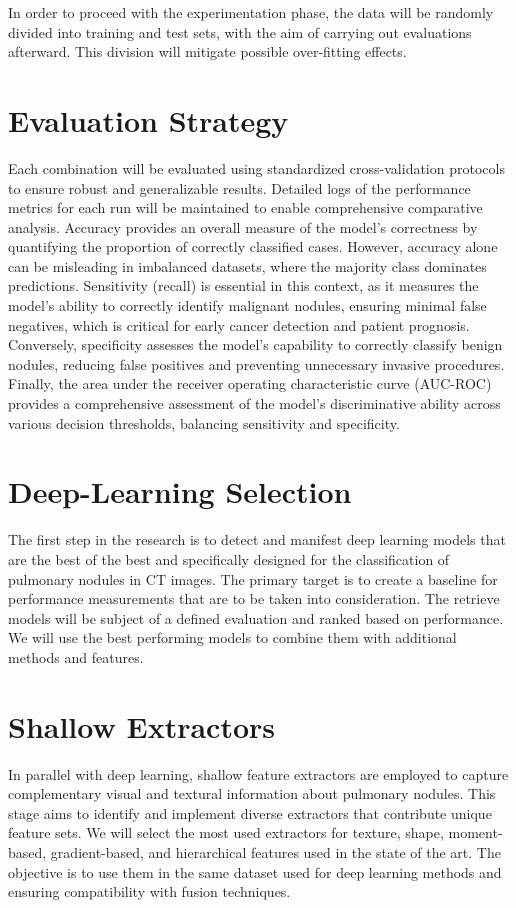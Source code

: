     In order to proceed with the experimentation phase, the data will be randomly divided into training and test sets, with the aim of carrying out evaluations afterward. This division will mitigate possible over-fitting effects.
        
\section{Evaluation Strategy}
Each combination will be evaluated using standardized cross-validation protocols to ensure robust and generalizable results. Detailed logs of the performance metrics for each run will be maintained to enable comprehensive comparative analysis.
Accuracy provides an overall measure of the model’s correctness by quantifying the proportion of correctly classified cases. However, accuracy alone can be misleading in imbalanced datasets, where the majority class dominates predictions. Sensitivity (recall) is essential in this context, as it measures the model's ability to correctly identify malignant nodules, ensuring minimal false negatives, which is critical for early cancer detection and patient prognosis. Conversely, specificity assesses the model’s capability to correctly classify benign nodules, reducing false positives and preventing unnecessary invasive procedures. Finally, the area under the receiver operating characteristic curve (AUC-ROC) provides a comprehensive assessment of the model's discriminative ability across various decision thresholds, balancing sensitivity and specificity.

\section{Deep-Learning Selection}
The first step in the research is to detect and manifest deep learning models that are the best of the best and specifically designed for the classification of pulmonary nodules in CT images. The primary target is to create a baseline for performance measurements that are to be taken into consideration. The retrieve models will be subject of a defined evaluation and ranked based on performance. We will use the best performing models to combine them with additional methods and features. 

\section{Shallow Extractors}
In parallel with deep learning, shallow feature extractors are employed to capture complementary visual and textural information about pulmonary nodules. This stage aims to identify and implement diverse extractors that contribute unique feature sets. We will select the most used extractors for texture, shape, moment-based, gradient-based, and hierarchical features used in the state of the art.
The objective is to use them in the same dataset used for deep learning methods and ensuring compatibility with fusion techniques.

